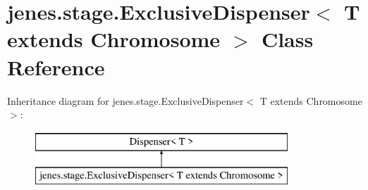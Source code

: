 \hypertarget{classjenes_1_1stage_1_1_exclusive_dispenser_3_01_t_01extends_01_chromosome_01_4}{\section{jenes.\-stage.\-Exclusive\-Dispenser$<$ T extends Chromosome $>$ Class Reference}
\label{classjenes_1_1stage_1_1_exclusive_dispenser_3_01_t_01extends_01_chromosome_01_4}
}
Inheritance diagram for jenes.\-stage.\-Exclusive\-Dispenser$<$ T extends Chromosome $>$\-:\begin{figure}[H]
\begin{center}
\leavevmode
\includegraphics[height=2.000000cm]{classjenes_1_1stage_1_1_exclusive_dispenser_3_01_t_01extends_01_chromosome_01_4}
\end{center}
\end{figure}

